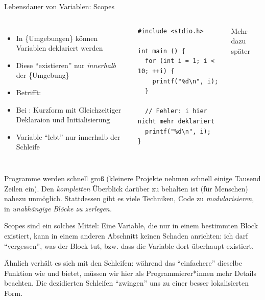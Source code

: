 \begin{frame}[fragile]{Lebensdauer von Variablen: Scopes}
%
\begin{columns}[T]
\begin{itemize}
\item In \{Umgebungen\} können Variablen deklariert werden
\item Diese \enquote{existieren} nur \emph{innerhalb} der \{Umgebung\}
\item Betrifft: 
\item Bei : Kurzform mit Gleichzeitiger Deklaraion und Initialisierung
\item Variable \enquote{lebt} nur innerhalb der Schleife
\end{itemize}
%
\vspace{-6pt}
\begin{codebox}
\begin{verbatim}
#include <stdio.h>

int main () {
  for (int i = 1; i < 10; ++i) {
    printf("%d\n", i);
  }
  
  // Fehler: i hier nicht mehr deklariert
  printf("%d\n", i);
}
\end{verbatim}
\end{codebox}
Mehr dazu später
\end{columns}
%
\end{frame}


\begin{frame}
%
\begin{hintbox}
Programme werden schnell groß (kleinere Projekte nehmen schnell einige Tausend Zeilen ein). Den \emph{kompletten} Überblick darüber zu behalten ist (für Menschen) nahezu unmöglich. Stattdessen gibt es viele Techniken, Code zu \emph{modularisieren}, \ie in \emph{unabhängige Blöcke zu zerlegen.}

\vspace{3pt}
Scopes sind ein solches Mittel: Eine Variable, die nur in einem bestimmten Block existiert, kann in einem anderen Abschnitt keinen Schaden anrichten: ich darf \enquote{vergessen}, was der Block tut, bzw. dass die Variable dort überhaupt existiert.

\vspace{3pt}
Ähnlich verhält es sich mit den Schleifen: während das \enquote{einfachere}  dieselbe Funktion wie  und  bietet, müssen wir hier als Programmierer*innen mehr Details beachten. Die dezidierten Schleifen \enquote{zwingen} uns zu einer besser lokalisierten Form.
\end{hintbox}
%
\end{frame}

